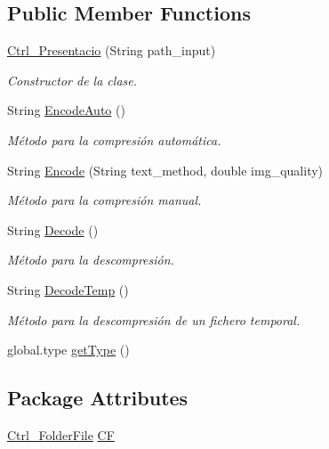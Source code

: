 \subsection*{Public Member Functions}
\begin{DoxyCompactItemize}
\item 
\hyperlink{classpresentacion_1_1Ctrl__Presentacio_1_1Ctrl__Presentacio_a3d3ac2a3c4b9fa715bb631fdf3a955dd}{Ctrl\+\_\+\+Presentacio} (String path\+\_\+input)
\begin{DoxyCompactList}\small\item\em Constructor de la clase. \end{DoxyCompactList}\item 
String \hyperlink{classpresentacion_1_1Ctrl__Presentacio_1_1Ctrl__Presentacio_a3c70338349a2890f5191162b22ee78dc}{Encode\+Auto} ()
\begin{DoxyCompactList}\small\item\em Método para la compresión automática. \end{DoxyCompactList}\item 
String \hyperlink{classpresentacion_1_1Ctrl__Presentacio_1_1Ctrl__Presentacio_a83ea715afbbe389c6f1fb68f29121205}{Encode} (String text\+\_\+method, double img\+\_\+quality)
\begin{DoxyCompactList}\small\item\em Método para la compresión manual. \end{DoxyCompactList}\item 
String \hyperlink{classpresentacion_1_1Ctrl__Presentacio_1_1Ctrl__Presentacio_adc652f63ed7619207a94a3a58b6bdd77}{Decode} ()
\begin{DoxyCompactList}\small\item\em Método para la descompresión. \end{DoxyCompactList}\item 
String \hyperlink{classpresentacion_1_1Ctrl__Presentacio_1_1Ctrl__Presentacio_aa9c12bc59a7e9fa0ccd09c0e007d4a4c}{Decode\+Temp} ()
\begin{DoxyCompactList}\small\item\em Método para la descompresión de un fichero temporal. \end{DoxyCompactList}\item 
global.\+type \hyperlink{classpresentacion_1_1Ctrl__Presentacio_1_1Ctrl__Presentacio_a029db5d77bf1e81be0811816a74d81a0}{get\+Type} ()
\end{DoxyCompactItemize}
\subsection*{Package Attributes}
\begin{DoxyCompactItemize}
\item 
\hyperlink{classdomini_1_1folders_1_1Ctrl__FolderFile}{Ctrl\+\_\+\+Folder\+File} \hyperlink{classpresentacion_1_1Ctrl__Presentacio_1_1Ctrl__Presentacio_af46ef2ef420276ff830c2f0ff8c1a7e6}{CF}
\end{DoxyCompactItemize}
